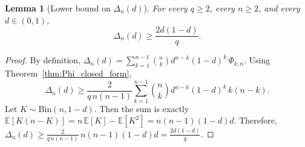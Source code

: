 \documentclass[conference]{IEEEtran}
\newtheorem{lemma}{Lemma}
\begin{document}
\begin{lemma}[Lower bound on $\Delta_n(d)$]
\label{lem:Delta_bound}
For every $q\ge 2$, every $n\ge 2$, and every $d\in(0,1)$,
\begin{equation}
  \Delta_n(d)\ge \frac{2d(1-d)}{q}.
  \label{eq:Delta_bound}
\end{equation}
\end{lemma}

\begin{proof}
By definition,
\(
\Delta_n(d)=\sum_{k=1}^{n-1} \binom{n}{k} d^{n-k}(1-d)^k \,\Phi_{k,n}.
\)
Using Theorem~\ref{thm:Phi_closed_form},
\[
\Delta_n(d)\ge
\frac{2}{q\,n(n-1)}
\sum_{k=1}^{n-1}\binom{n}{k} d^{n-k}(1-d)^k\,k(n-k).
\]
Let $K\sim\mathrm{Bin}(n,1-d)$. Then the sum is exactly
\(
\mathbb{E}[K(n-K)]
= n\,\mathbb{E}[K]-\mathbb{E}[K^2]
= n(n-1)(1-d)d.
\)
Therefore,
\(
\Delta_n(d)\ge
\frac{2}{q\,n(n-1)}\,n(n-1)(1-d)d
=\frac{2d(1-d)}{q}.
\)
\end{proof}

\end{document}
